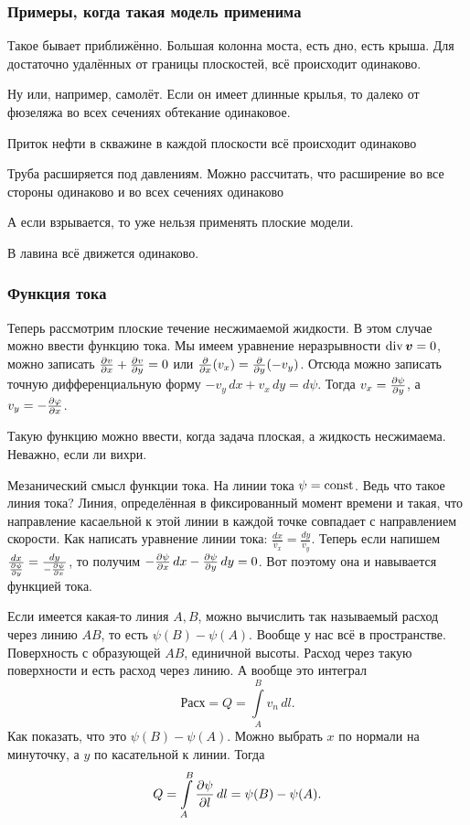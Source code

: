 \subsubsection{Примеры, когда такая модель применима}
Такое бывает приближённо. Большая колонна моста, есть дно, есть крыша. Для достаточно удалённых от границы плоскостей, всё происходит одинаково.

Ну или, например, самолёт.
Если он имеет длинные крылья, то далеко от фюзеляжа во всех сечениях обтекание одинаковое.

Приток нефти в скважине в каждой плоскости всё происходит одинаково

Труба расширяется под давлениям. Можно рассчитать, что расширение во все стороны одинаково и во всех сечениях одинаково

А если взрывается, то уже нельзя применять плоские модели.

В лавина всё движется одинаково.

\subsubsection{Функция тока}
Теперь рассмотрим плоские течение несжимаемой жидкости. В этом случае можно ввести функцию тока. Мы имеем уравнение неразрывности $\operatorname{div} \boldsymbol{v}= 0$, можно записать $\frac{\partial v}{\partial x} + \frac{\partial v}{\partial y} = 0$ или $\frac{\partial }{\partial x}(v_x) = \frac{\partial }{\partial y}(-v_y)$. Отсюда можно записать точную дифференциальную форму $-v_y\,dx + v_x\,dy = d\psi$. Тогда $v_x = \frac{\partial \psi}{\partial y}$, а $v_y = -\frac{\partial \varphi}{\partial x}$.

Такую функцию можно ввести, когда задача плоская, а жидкость несжимаема. Неважно, если ли вихри.

Мезанический смысл функции тока. На линии тока $\psi = \operatorname{const}$. Ведь что такое линия тока? Линия, определённая в фиксированный момент времени и такая, что направление касаельной к этой линии в каждой точке совпадает с направлением скорости.
Как написать уравнение линии тока: $\frac{dx}{v_x} = \frac{dy}{v_y}$. Теперь если напишем $\frac{dx}{\frac{\partial \psi}{\partial y}} = \frac{dy}{-\frac{\partial \psi}{\partial x}}$, то получим $-\frac{\partial \psi}{\partial x}\,dx - \frac{\partial \psi}{\partial y}\,dy = 0$. Вот поэтому она и навывается функцией тока.

Если имеется какая-то линия $A,B$, можно вычислить так называемый расход через линию $AB$, то есть $\psi(B)- \psi(A)$.
Вообще у нас всё в пространстве. Поверхность с образующей $AB$, единичной высоты. Расход через такую поверхности и есть расход через линию. А вообще это интеграл
\[
  \text{Расх} = Q = \int\limits_A^B v_n\,dl.
\]
Как показать, что это $\psi(B)- \psi(A)$. Можно выбрать $x$ по нормали на минуточку, а $y$ по касательной к линии. Тогда
\[
  Q = \int\limits_A^B\frac{\partial \psi}{\partial l}\,dl = \psi(B)-\psi(A).
\]

